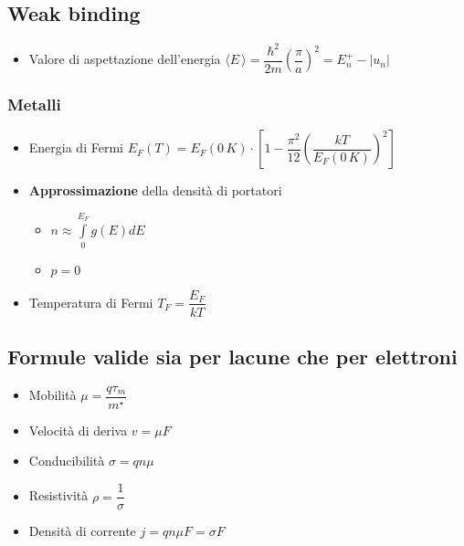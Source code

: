 \documentclass[9pt]{extarticle}
\begin{document}
\subsection{Weak binding}
\begin{itemize}
  \item Valore di aspettazione dell'energia \( \langle E \, \rangle = \dfrac{\hbar ^ 2}{2 m} \left(\dfrac{\pi}{a}\right) ^ 2 = E_n^+ - | u_n | \)
\end{itemize}

\subsubsection{Metalli}
\begin{itemize}
  \item Energia di Fermi \( E_F(T) = E_F(0 \, K) \cdot \left[ 1 - \dfrac{\pi ^ 2}{12} \left( \dfrac{kT}{E_F(0 \, K)}\right) ^ 2\right]\)
  \item \textbf{Approssimazione} della densità di portatori
        \begin{itemize}
          \item \( \displaystyle n \approx \int\limits_{0}^{E_F} g(E) dE \)
          \item \( p = 0 \)
        \end{itemize}
  \item Temperatura di Fermi \( T_{F} = \dfrac{E_F}{k T} \)
\end{itemize}

\subsection{Formule valide sia per lacune che per elettroni}
\begin{itemize}
  \item Mobilità \( \mu = \dfrac{q \tau_m}{m^\star} \)
  \item Velocità di deriva \( v = \mu F \)
  \item Conducibilità \( \sigma = q n \mu \)
  \item Resistività \( \rho = \dfrac{1}{\sigma} \)
  \item Densità di corrente \( j = q n \mu F = \sigma F \)
\end{itemize}

\newpage
\end{document}
